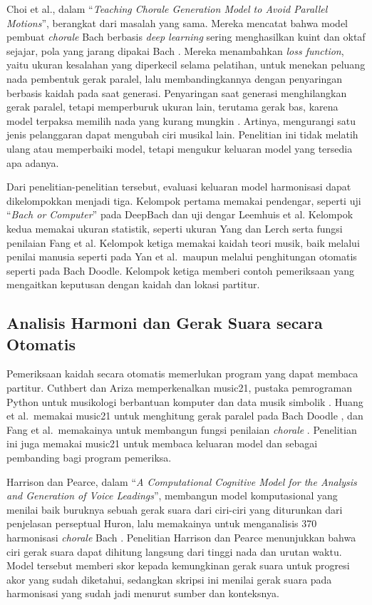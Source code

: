 Choi et al., dalam ``\textit{Teaching Chorale Generation Model to Avoid Parallel Motions}'', berangkat dari masalah yang sama. Mereka mencatat bahwa model pembuat \textit{chorale} Bach berbasis \textit{deep learning} sering menghasilkan kuint dan oktaf sejajar, pola yang jarang dipakai Bach \parencite[186, 188]{choi2023}. Mereka menambahkan \textit{loss function}, yaitu ukuran kesalahan yang diperkecil selama pelatihan, untuk menekan peluang nada pembentuk gerak paralel, lalu membandingkannya dengan penyaringan berbasis kaidah pada saat generasi. Penyaringan saat generasi menghilangkan gerak paralel, tetapi memperburuk ukuran lain, terutama gerak bas, karena model terpaksa memilih nada yang kurang mungkin \parencite[193--194]{choi2023}. Artinya, mengurangi satu jenis pelanggaran dapat mengubah ciri musikal lain. Penelitian ini tidak melatih ulang atau memperbaiki model, tetapi mengukur keluaran model yang tersedia apa adanya.

Dari penelitian-penelitian tersebut, evaluasi keluaran model harmonisasi dapat dikelompokkan menjadi tiga. Kelompok pertama memakai pendengar, seperti uji ``\textit{Bach or Computer}'' pada DeepBach dan uji dengar Leemhuis et al. Kelompok kedua memakai ukuran statistik, seperti ukuran Yang dan Lerch serta fungsi penilaian Fang et al. Kelompok ketiga memakai kaidah teori musik, baik melalui penilai manusia seperti pada Yan et al.\ maupun melalui penghitungan otomatis seperti pada Bach Doodle. Kelompok ketiga memberi contoh pemeriksaan yang mengaitkan keputusan dengan kaidah dan lokasi partitur.

\subsection{Analisis Harmoni dan Gerak Suara secara Otomatis}\label{sec:analisis-harmoni-komputasional}

Pemeriksaan kaidah secara otomatis memerlukan program yang dapat membaca partitur. Cuthbert dan Ariza memperkenalkan music21, pustaka pemrograman Python untuk musikologi berbantuan komputer dan data musik simbolik \parencite{cuthbert2010}. Huang et al.\ memakai music21 untuk menghitung gerak paralel pada Bach Doodle \parencite[798]{huang2019}, dan Fang et al.\ memakainya untuk membangun fungsi penilaian \textit{chorale} \parencite{fang2020}. Penelitian ini juga memakai music21 untuk membaca keluaran model dan sebagai pembanding bagi program pemeriksa.

Harrison dan Pearce, dalam ``\textit{A Computational Cognitive Model for the Analysis and Generation of Voice Leadings}'', membangun model komputasional yang menilai baik buruknya sebuah gerak suara dari ciri-ciri yang diturunkan dari penjelasan perseptual Huron, lalu memakainya untuk menganalisis 370 harmonisasi \textit{chorale} Bach \parencite{harrison2020}. Penelitian Harrison dan Pearce menunjukkan bahwa ciri gerak suara dapat dihitung langsung dari tinggi nada dan urutan waktu. Model tersebut memberi skor kepada kemungkinan gerak suara untuk progresi akor yang sudah diketahui, sedangkan skripsi ini menilai gerak suara pada harmonisasi yang sudah jadi menurut sumber dan konteksnya.

